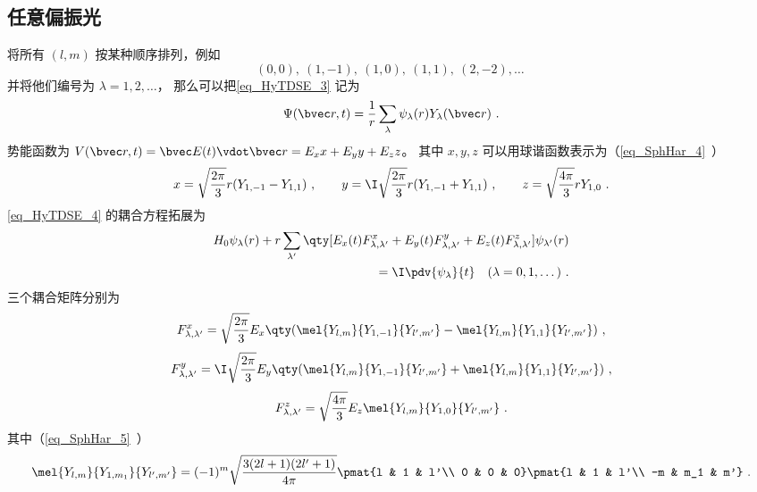 \subsection{任意偏振光}
将所有 $(l,m)$ 按某种顺序排列，例如
\begin{equation}
(0, 0),\ (1,-1),\ (1,0),\ (1,1),\ (2,-2), \dots~
\end{equation}
并将他们编号为 $\lambda = 1,2, \dots$， 那么可以把\autoref{eq_HyTDSE_3} 记为
\begin{equation}
\Psi(\bvec r, t) = \frac{1}{r}\sum_\lambda \psi_\lambda(r) Y_\lambda(\bvec r)~.
\end{equation}
势能函数为 $V(\bvec r, t) = \bvec E(t) \vdot \bvec r  = E_x x + E_y y + E_z z$。 其中 $x,y,z$ 可以用球谐函数表示为（\autoref{eq_SphHar_4}~）
\begin{equation}
x = \sqrt{\frac{2\pi}{3}} r (Y_{1,-1} - Y_{1,1})~, \qquad
y = \I \sqrt{\frac{2\pi}{3}} r (Y_{1,-1}+Y_{1,1})~, \qquad
z = \sqrt{\frac{4\pi}{3}} rY_{1,0}~.
\end{equation}
\autoref{eq_HyTDSE_4} 的耦合方程拓展为
\begin{equation}
\begin{aligned}
H_0 \psi_{\lambda}(r) + r \sum_{\lambda'} \qty[E_x(t) F_{\lambda, \lambda'}^{x} + E_y(t) F_{\lambda, \lambda'}^{y} + E_z(t) F_{\lambda, \lambda'}^{z}] \psi_{\lambda'}(r) \\
= \I \pdv{\psi_{\lambda}}{t} \quad (\lambda=0,1,\dots)~.
\end{aligned}
\end{equation}
三个耦合矩阵分别为
\begin{equation}
\begin{aligned}
F_{\lambda,\lambda'}^{x} = \sqrt{\frac{2\pi}{3}} E_x \qty(\mel{Y_{l,m}}{Y_{1,-1}}{Y_{l',m'}} - \mel{Y_{l,m}}{Y_{1,1}}{Y_{l',m'}})~,
\end{aligned}
\end{equation}
\begin{equation}
\begin{aligned}
F_{\lambda,\lambda'}^{y} = \I\sqrt{\frac{2\pi}{3}} E_y \qty(\mel{Y_{l,m}}{Y_{1,-1}}{Y_{l',m'}} + \mel{Y_{l,m}}{Y_{1,1}}{Y_{l',m'}})~,
\end{aligned}
\end{equation}
\begin{equation}
\begin{aligned}
F_{\lambda,\lambda'}^{z} = \sqrt{\frac{4\pi}{3}} E_z \mel{Y_{l,m}}{Y_{1,0}}{Y_{l',m'}}~.
\end{aligned}
\end{equation}
其中（\autoref{eq_SphHar_5}~）
\begin{equation}
\mel{Y_{l,m}}{Y_{1,m_1}}{Y_{l',m'}} = (-1)^m\sqrt{\frac{3(2l+1)(2l'+1)}{4\pi}} \pmat{l & 1 & l'\\ 0 & 0 & 0}\pmat{l & 1 & l'\\ -m & m_1 & m'}~.
\end{equation}

